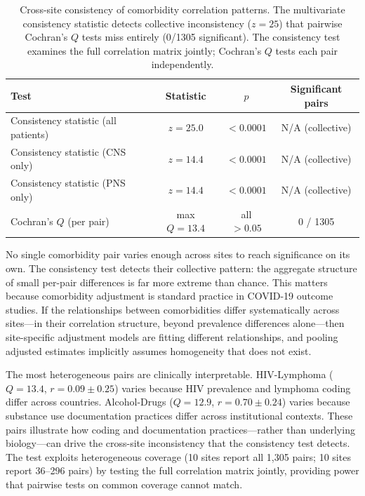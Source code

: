 \documentclass{article}
\begin{document}
\begin{table}[t]
\centering
\caption{Cross-site consistency of comorbidity correlation patterns. The multivariate consistency statistic detects collective inconsistency ($z = 25$) that pairwise Cochran's $Q$ tests miss entirely (0/1305 significant). The consistency test examines the full correlation matrix jointly; Cochran's $Q$ tests each pair independently.}
\label{tab:consistency}
\begin{tabular}{lccc}
\toprule
Test & Statistic & $p$ & Significant pairs \\
\midrule
Consistency statistic (all patients) & $z = 25.0$ & $< 0.0001$ & N/A (collective) \\
Consistency statistic (CNS only) & $z = 14.4$ & $< 0.0001$ & N/A (collective) \\
Consistency statistic (PNS only) & $z = 14.4$ & $< 0.0001$ & N/A (collective) \\
Cochran's $Q$ (per pair) & max $Q = 13.4$ & all $> 0.05$ & 0 / 1305 \\
\bottomrule
\end{tabular}
\end{table}

No single comorbidity pair varies enough across sites to reach significance on its own.
The consistency test detects their collective pattern: the aggregate structure of small per-pair differences is far more extreme than chance.
This matters because comorbidity adjustment is standard practice in COVID-19 outcome studies.
If the relationships between comorbidities differ systematically across sites---in their correlation structure, beyond prevalence differences alone---then site-specific adjustment models are fitting different relationships, and pooling adjusted estimates implicitly assumes homogeneity that does not exist.

The most heterogeneous pairs are clinically interpretable.
HIV-Lymphoma ($Q = 13.4$, $r = 0.09 \pm 0.25$) varies because HIV prevalence and lymphoma coding differ across countries.
Alcohol-Drugs ($Q = 12.9$, $r = 0.70 \pm 0.24$) varies because substance use documentation practices differ across institutional contexts.
These pairs illustrate how coding and documentation practices---rather than underlying biology---can drive the cross-site inconsistency that the consistency test detects.
The test exploits heterogeneous coverage (10 sites report all 1,305 pairs; 10 sites report 36--296 pairs) by testing the full correlation matrix jointly, providing power that pairwise tests on common coverage cannot match.
\end{document}
